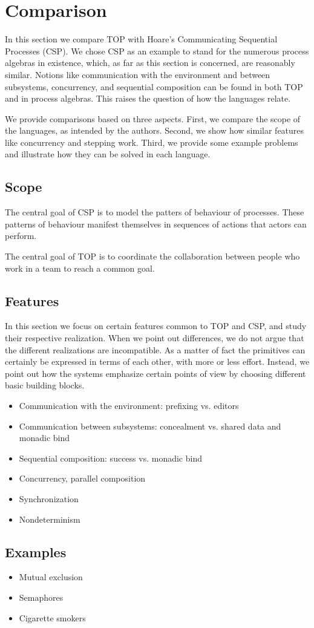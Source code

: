 
\section{Comparison}

In this section we compare TOP with Hoare's Communicating Sequential Processes (CSP).
We chose CSP as an example to stand for the numerous process algebras in existence, which, as far as this section is concerned, are reasonably similar.
Notions like communication with the environment and between subsystems, concurrency, and sequential composition can be found in both TOP and in process algebras.
This raises the question of how the languages relate.

We provide comparisons based on three aspects.
First, we compare the scope of the languages, as intended by the authors.
Second, we show how similar features like concurrency and stepping work.
Third, we provide some example problems and illustrate how they can be solved in each language.

\subsection{Scope}

The central goal of CSP is to model the patters of behaviour of processes.
These patterns of behaviour manifest themselves in sequences of actions that actors can perform.

The central goal of TOP is to coordinate the collaboration between people who work in a team to reach a common goal.

\subsection{Features}

In this section we focus on certain features common to TOP and CSP, and study their respective realization.
When we point out differences, we do not argue that the different realizations are incompatible.
As a matter of fact the primitives can certainly be expressed in terms of each other, with more or less effort.
Instead, we point out how the systems emphasize certain points of view by choosing different basic building blocks.

\begin{itemize}
\item Communication with the environment: prefixing vs. editors
\item Communication between subsystems: concealment vs. shared data and monadic bind
\item Sequential composition: success vs. monadic bind
\item Concurrency, parallel composition
\item Synchronization
\item Nondeterminism
\end{itemize}

\subsection{Examples}

\begin{itemize}
\item Mutual exclusion
\item Semaphores
\item Cigarette smokers
\end{itemize}
